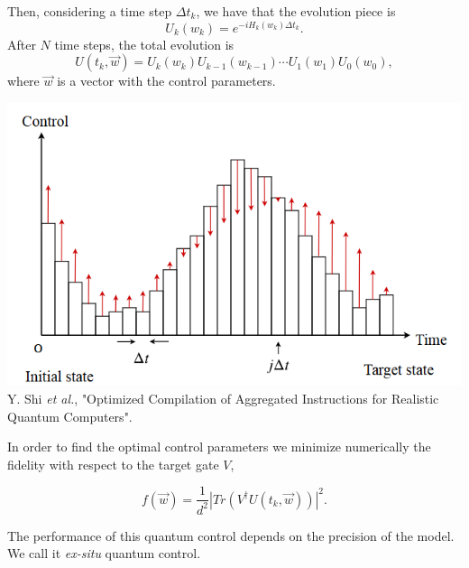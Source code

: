 \documentclass[12pt,aspectratio=169]{beamer}
\begin{document}
	\begin{frame}
		Then, considering a time step $\Delta t_k$, we have that the evolution piece is 
		\begin{equation*}
			U_k(w_k) = e^{-iH_k(w_k)\Delta t_k }.
		\end{equation*}
		After $N$ time steps, the total evolution is
		\begin{equation*}
			U(t_k,\vec{w}) = U_k(w_k)U_{k-1}(w_{k-1})\cdots U_1(w_1)U_{0}(w_{0}),
		\end{equation*}
		where $\vec{w}$ is a vector with the control parameters.
		
		\centering
		\includegraphics[scale=0.5]{grape}\\
		
		{\scriptsize  
			Y. Shi \emph{et al.}, "Optimized Compilation of Aggregated Instructions for Realistic Quantum Computers".}
		
	\end{frame}


	\begin{frame}
		In order to find the optimal control parameters we minimize numerically the fidelity with respect to the target gate $V$,
		
		\begin{equation*}
			f(\vec{w}) = \frac{1}{d^2} |  Tr( V^\dagger U(t_k,\vec{w})  ) |^2.
		\end{equation*}
		
		The performance of this quantum control depends on the precision of the model. We call it \emph{ex-situ} quantum control.
	\end{frame}
\end{document}

